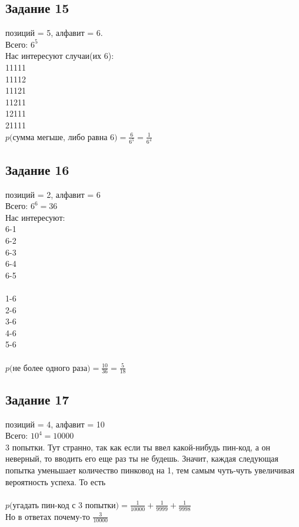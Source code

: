 \documentclass[12pt]{article}
\begin{document}
\newpage
\subsection{Задание 15}

позиций = 5, алфавит = 6.\\
Всего: $6^5$\\
Нас интересуют случаи(их 6):\\
11111\\
11112\\
11121\\
11211\\
12111\\
21111\\
$p($сумма мегьше, либо равна 6$) =\frac{6}{6^5}=\frac{1}{6^4}$ 

\newpage
\subsection{Задание 16}

позиций = 2, алфавит = 6\\
Всего: $6^6=36$\\
Нас интересуют:\\
6-1\\
6-2\\
6-3\\
6-4\\
6-5\\
\\
1-6\\
2-6\\
3-6\\
4-6\\
5-6\\
\\
$p($не более одного раза$)=\frac{10}{36}=\frac{5}{18}$

\newpage
\subsection{Задание 17}


позиций = 4, алфавит = 10\\
Всего: $10^4=10000$\\
3 попытки. Тут странно, так как если ты ввел какой-нибудь пин-код, а он неверный, то вводить его еще раз ты не будешь. Значит, каждая следующая попытка уменьшает количество пинковод на 1, тем самым чуть-чуть увеличивая вероятность успеха. То есть\\
\\
$p($угадать пин-код с 3 попытки$)=\frac{1}{10000}+\frac{1}{9999}+\frac{1}{9998}$\\
Но в ответах почему-то $\frac{3}{10000}$
\end{document}
